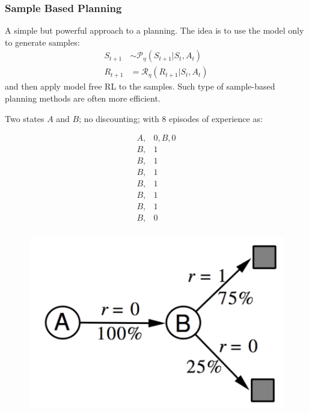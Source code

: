 \subsubsection*{Sample Based Planning}
A simple but powerful approach to a planning. The idea is to use the model only to generate samples:
\[
    \begin{aligned}
        S_{t+1} &\sim \mathcal{P}_\eta(S_{t+1}  | S_t, A_t) \\
        R_{t+1} &= \mathcal{R}_\eta(R_{t+1} | S_t, A_t)
    \end{aligned}        
\]
and then apply model free RL to the samples. Such type of sample-based planning methods are 
often more efficient.


\begin{example}[AB Example]
    Two states \(A\) and \(B\); no discounting; with 8 episodes of experience as:
    \begin{figure}[H]
        \begin{minipage}{0.33\textwidth}
            \[
                \begin{aligned}
                    A, & 0, B, 0 \\
                    B, & 1\\ 
                    B, & 1\\        
                    B, & 1\\        
                    B, & 1\\        
                    B, & 1\\        
                    B, & 1\\        
                    B, & 0\\        
                \end{aligned}
            \]
        \end{minipage}%
        \begin{minipage}{0.33\textwidth}
            \includegraphics[width=\textwidth]{figures/ab-ex.png}

\end{minipage}
\end{figure}
\end{example}
